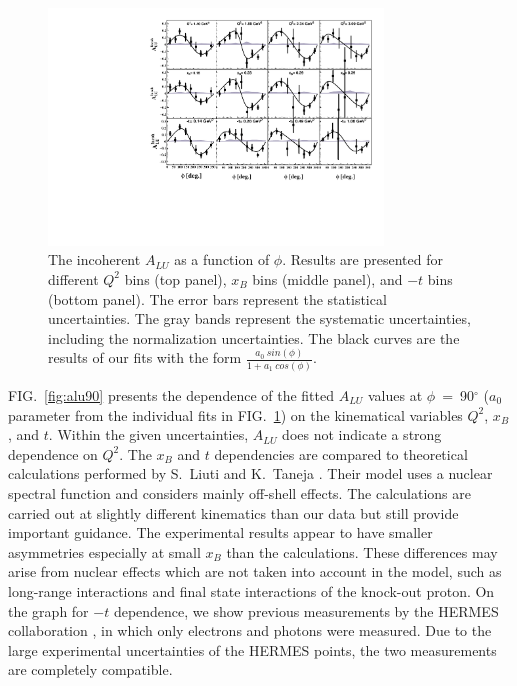 \documentclass[twocolumn,nofootinbib,showpacs,prl,superscriptaddress,secnumarabic,amssymb,nobibnotes,aps,floatfix]{revtex4}
\begin{document}
\begin{figure}[tb]
\includegraphics[width=8.9cm]{figs/incoherent_ALU_phi.pdf}
\caption{The incoherent $A_{LU}$ as a function of $\phi$. Results are presented
   for different $Q^{2}$ bins (top panel), $x_{B}$ bins (middle panel), and 
   $-t$ bins (bottom panel). The error bars represent the statistical 
   uncertainties. The gray bands represent the systematic uncertainties, 
   including the normalization uncertainties. The black curves are the results 
   of our fits with the form $\frac{a_{0}~sin(\phi)}{1+ a_{1}~cos(\phi)}$.}
\label{fig:alu}
\end{figure}


FIG.~\ref{fig:alu90} presents the dependence of the fitted $A_{LU}$ values at 
$\phi$~=~90$^{\circ}$ ($a_{0}$ parameter from the individual fits in 
FIG.~\ref{fig:alu}) on the kinematical variables $Q^2$, $x_{B}$, and $t$.  
Within the given uncertainties, $A_{LU}$ does not indicate a strong dependence 
on $Q^2$.  The $x_{B}$ and $t$ dependencies are compared to theoretical 
calculations performed by S.~Liuti and K.~Taneja \cite{simonetta_2}. Their 
model uses a nuclear spectral function and considers mainly off-shell effects.  
The calculations are carried out at slightly different kinematics than our data 
but still provide important guidance. The experimental results appear to have 
smaller asymmetries especially at small $x_{B}$ than the calculations. These 
differences may arise from nuclear effects which are not taken into account in 
the model, such as long-range interactions and final state interactions of the 
knock-out proton. On the graph for $-t$ dependence, we show previous 
measurements by the HERMES collaboration \cite{Airapetian:2009cga}, in which 
only electrons and photons were measured. Due to the large experimental 
uncertainties of the HERMES points, the two measurements are completely 
compatible. 
\end{document}
